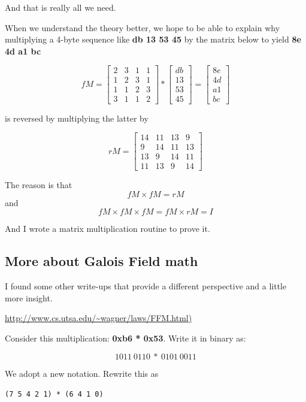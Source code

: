 \documentclass[11pt, oneside]{article}
\begin{document}
And that is really all we need.

When we understand the theory better, we hope to be able to explain why multiplying a 4-byte sequence like \textbf{db 13 53 45} by the matrix below to yield \textbf{8e 4d a1 bc} 

\[ fM =
\begin{bmatrix}
2 & 3 & 1 & 1 \\
1 & 2 & 3 & 1 \\
1 & 1 & 2 & 3 \\
3 & 1 & 1 & 2
\end{bmatrix} 
*
\begin{bmatrix}
db \\
13 \\
53 \\
45
\end{bmatrix} 
=
\begin{bmatrix}
8e \\
4d \\
a1 \\
bc
\end{bmatrix} 
\]


is reversed by multiplying the latter by

\[ rM = 
\begin{bmatrix}
14 &11 &13 & 9 \\
9 &14 &11 & 13 \\
13 & 9 &14 & 11 \\
11 &13 & 9 & 14
\end{bmatrix} \]

The reason is that 
\[ fM \times fM = rM \]
and
\[ fM \times fM \times fM = fM \times rM = I \]

And I wrote a matrix multiplication routine to prove it.

\subsection*{More about Galois Field math}

I found some other write-ups that provide a different perspective and a little more insight.

\url{http://www.cs.utsa.edu/~wagner/laws/FFM.html)}

Consider this multiplication: \textbf{ 0xb6 * 0x53}.  Write it in binary as:

\[ 1011\ 0110\ * \ 0101\ 0011 \]

We adopt a new notation.  Rewrite this as

\texttt{(7\ 5\ 4\ 2\ 1) * (6\ 4\ 1\ 0)}
\end{document}
